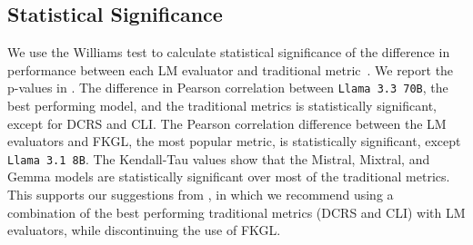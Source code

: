 \subsection{Statistical Significance}\label{appendix:sig-testing}
We use the Williams test to calculate statistical significance of the difference in performance between each LM evaluator and traditional metric~\cite{graham-baldwin-2014-testing}. We report the p-values in . The difference in Pearson correlation between \texttt{Llama 3.3 70B}, the best performing model, and the traditional metrics is statistically significant, except for DCRS and CLI. The Pearson correlation difference between the LM evaluators and FKGL, the most popular metric, is statistically significant, except \texttt{Llama 3.1 8B}. The Kendall-Tau values show that the Mistral, Mixtral, and Gemma models are statistically significant over most of the traditional metrics. This supports our suggestions from , in which we recommend using a combination of the best performing traditional metrics (DCRS and CLI) with LM evaluators, while discontinuing the use of FKGL. 

